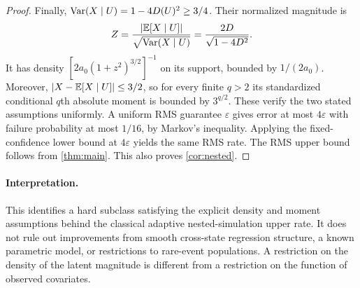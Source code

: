 \begin{proof}
Finally, $\operatorname{Var}(X\mid U)=1-4D(U)^2\ge3/4$. Their normalized magnitude is
\[
Z=\frac{|\mathbb E[X\mid U]|}{\sqrt{\operatorname{Var}(X\mid U)}}
=\frac{2D}{\sqrt{1-4D^2}}.
\]
It has density $[2a_0(1+z^2)^{3/2}]^{-1}$ on its support, bounded by $1/(2a_0)$. Moreover, $|X-\mathbb E[X\mid U]|\le3/2$, so for every finite $q>2$ its standardized conditional $q$th absolute moment is bounded by $3^{q/2}$. These verify the two stated assumptions uniformly.
A uniform RMS guarantee $\varepsilon$ gives error at most
$4\varepsilon$ with failure probability at most $1/16$, by Markov's
inequality. Applying the fixed-confidence lower bound at $4\varepsilon$
yields the same RMS rate. The RMS upper bound follows from
\cref{thm:main}. This also proves \cref{cor:nested}.
\end{proof}

\paragraph{Interpretation.}
This identifies a hard subclass satisfying the explicit density and moment assumptions behind the classical adaptive nested-simulation upper rate. It does not rule out improvements from smooth cross-state regression structure, a known parametric model, or restrictions to rare-event populations. A restriction on the density of the latent magnitude is different from a restriction on the function of observed covariates.
